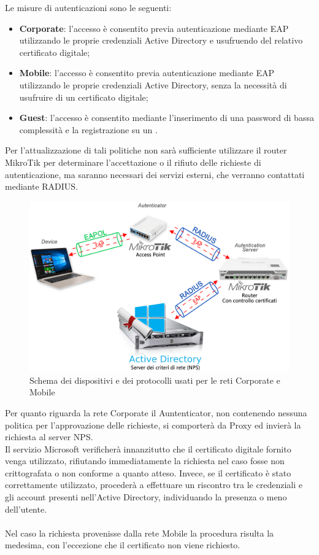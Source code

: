 \documentclass[Realizzazione.tex]{subfiles}
\begin{document}
Le misure di autenticazioni sono le seguenti:
\begin{itemize}
	\item \textbf{Corporate}: l'accesso è consentito previa autenticazione mediante EAP utilizzando le proprie credenziali Active Directory e usufruendo del relativo certificato digitale;
	\item \textbf{Mobile}: l'accesso è consentito previa autenticazione mediante EAP utilizzando le proprie credenziali Active Directory, senza la necessità di usufruire di un certificato digitale;
	\item \textbf{Guest}: l'accesso è consentito mediante l'inserimento di una password di bassa complessità e la registrazione su un .
\end{itemize}

Per l'attualizzazione di tali politiche non sarà sufficiente utilizzare il router MikroTik per determinare l'accettazione o il rifiuto delle richieste di autenticazione, ma saranno necessari dei servizi esterni, che verranno contattati mediante RADIUS. 


\newpage
\begin{figure}[H]
	\centering
	\includegraphics[width=1.1\linewidth]{"images/Schema_tecnologie_NPS"}
	\caption{Schema dei dispositivi e dei protocolli usati per le reti Corporate e Mobile}
	\label{fig:Schema dei dispositivi e dei protocolli usati per le reti Corporate e Mobile}
\end{figure}
Per quanto riguarda la rete Corporate il Auntenticator, non contenendo nessuna politica per l'approvazione delle richieste, si comporterà da Proxy ed invierà la richiesta al server NPS.\\
Il servizio Microsoft verificherà innanzitutto che il certificato digitale fornito venga utilizzato, rifiutando immediatamente la richiesta nel caso fosse non crittografata o non conforme a quanto atteso. Invece, se il certificato è stato correttamente utilizzato, procederà a effettuare un riscontro tra le credenziali e gli account presenti nell'Active Directory, individuando la presenza o meno dell'utente.\\\\
Nel caso la richiesta provenisse dalla rete Mobile la procedura risulta la medesima, con l'eccezione che il certificato non viene richiesto.
\end{document}

